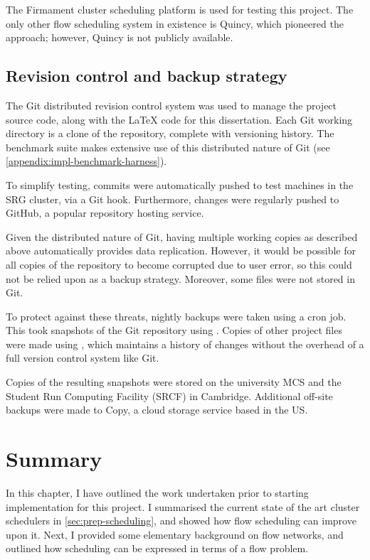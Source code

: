 The Firmament cluster scheduling platform is used for testing this project. The only other flow scheduling system in existence is Quincy, which pioneered the approach; however, Quincy is not publicly available.

\subsection{Revision control and backup strategy}

The Git distributed revision control system was used to manage the project source code, along with the {\LaTeX} code for this dissertation. Each Git working directory is a clone of the repository, complete with versioning history. The benchmark suite makes extensive use of this distributed nature of Git (see \cref{appendix:impl-benchmark-harness}).

To simplify testing, commits were automatically pushed to test machines in the SRG cluster, via a Git hook. Furthermore, changes were regularly pushed to GitHub, a popular repository hosting service.

Given the distributed nature of Git, having multiple working copies as described above automatically provides data replication. However, it would be possible for all copies of the repository to become corrupted due to user error, so this could not be relied upon as a backup strategy. Moreover, some files were not stored in Git\footnotemark.

To protect against these threats, nightly backups were taken using a cron job. This took snapshots of the Git repository using . Copies of other project files were made using , which maintains a history of changes without the overhead of a full version control system like Git.

Copies of the resulting snapshots were stored on the university MCS and the Student Run Computing Facility (SRCF) in Cambridge. Additional off-site backups were made to Copy, a cloud storage service based in the US.


\section{Summary}

In this chapter, I have outlined the work undertaken prior to starting implementation for this project. I summarised the current state of the art cluster schedulers in \cref{sec:prep-scheduling}, and showed how flow scheduling can improve upon it. Next, I provided some elementary background on flow networks, and outlined how scheduling can be expressed in terms of a flow problem.

